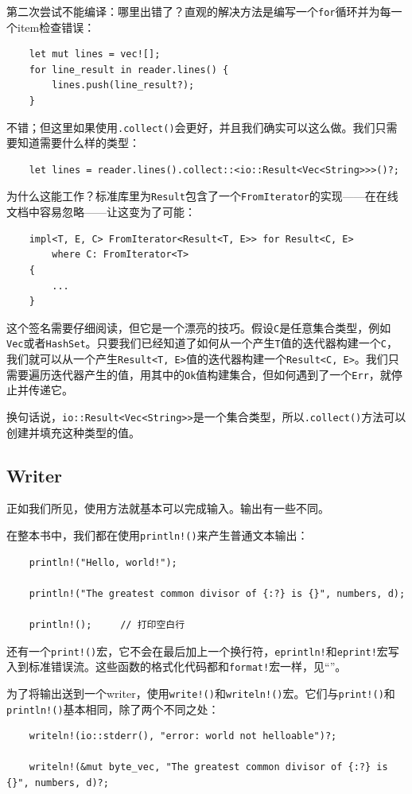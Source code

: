 第二次尝试不能编译：哪里出错了？直观的解决方法是编写一个\texttt{for}循环并为每一个item检查错误：
\begin{verbatim}
    let mut lines = vec![];
    for line_result in reader.lines() {
        lines.push(line_result?);
    }
\end{verbatim}

不错；但这里如果使用\texttt{.collect()}会更好，并且我们确实可以这么做。我们只需要知道需要什么样的类型：
\begin{verbatim}
    let lines = reader.lines().collect::<io::Result<Vec<String>>>()?;
\end{verbatim}

为什么这能工作？标准库里为\texttt{Result}包含了一个\texttt{FromIterator}的实现——在在线文档中容易忽略——让这变为了可能：
\begin{verbatim}
    impl<T, E, C> FromIterator<Result<T, E>> for Result<C, E>
        where C: FromIterator<T>
    {
        ...
    }
\end{verbatim}
这个签名需要仔细阅读，但它是一个漂亮的技巧。假设\texttt{C}是任意集合类型，例如\texttt{Vec}或者\texttt{HashSet}。只要我们已经知道了如何从一个产生\texttt{T}值的迭代器构建一个\texttt{C}，我们就可以从一个产生\texttt{Result<T, E>}值的迭代器构建一个\texttt{Result<C, E>}。我们只需要遍历迭代器产生的值，用其中的\texttt{Ok}值构建集合，但如何遇到了一个\texttt{Err}，就停止并传递它。

换句话说，\texttt{io::Result<Vec<String>>}是一个集合类型，所以\texttt{.collect()}方法可以创建并填充这种类型的值。

\subsection{Writer}
正如我们所见，使用方法就基本可以完成输入。输出有一些不同。

在整本书中，我们都在使用\texttt{println!()}来产生普通文本输出：
\begin{verbatim}
    println!("Hello, world!");

    println!("The greatest common divisor of {:?} is {}", numbers, d);

    println!();     // 打印空白行
\end{verbatim}

还有一个\texttt{print!()}宏，它不会在最后加上一个换行符，\texttt{eprintln!}和\texttt{eprint!}宏写入到标准错误流。这些函数的格式化代码都和\texttt{format!}宏一样，见“”。

为了将输出送到一个writer，使用\texttt{write!()}和\texttt{writeln!()}宏。它们与\texttt{print!()}和\texttt{println!()}基本相同，除了两个不同之处：
\begin{verbatim}
    writeln!(io::stderr(), "error: world not helloable")?;

    writeln!(&mut byte_vec, "The greatest common divisor of {:?} is {}", numbers, d)?;
\end{verbatim}

